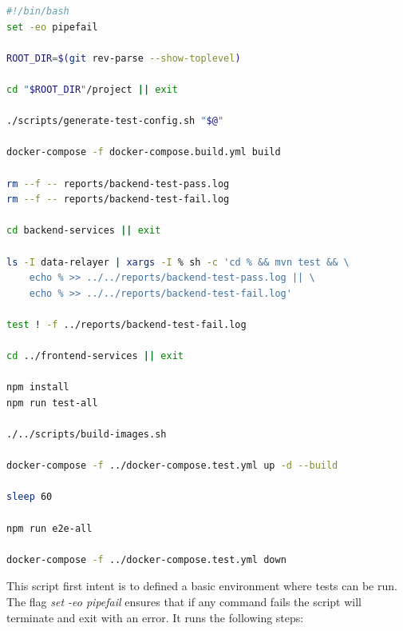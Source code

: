 \begin{lstlisting}[language=bash, style=bash, caption=Sensae Console Test Suite Script, label={code:implementation:decisions:actions:testscript}]
#!/bin/bash
set -eo pipefail

ROOT_DIR=$(git rev-parse --show-toplevel)

cd "$ROOT_DIR"/project || exit

./scripts/generate-test-config.sh "$@"

docker-compose -f docker-compose.build.yml build

rm --f -- reports/backend-test-pass.log
rm --f -- reports/backend-test-fail.log

cd backend-services || exit

ls -I data-relayer | xargs -I % sh -c 'cd % && mvn test && \
    echo % >> ../../reports/backend-test-pass.log || \
    echo % >> ../../reports/backend-test-fail.log'

test ! -f ../reports/backend-test-fail.log

cd ../frontend-services || exit

npm install
npm run test-all

./../scripts/build-images.sh

docker-compose -f ../docker-compose.test.yml up -d --build

sleep 60

npm run e2e-all

docker-compose -f ../docker-compose.test.yml down
\end{lstlisting}

This script first intent is to defined a basic environment where tests can be run.
The flag \textit{set -eo pipefail} ensures that if any command fails the script will terminate and exit with an error.
It runs the following steps:

